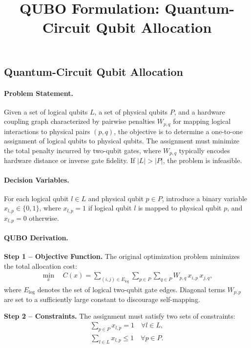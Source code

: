 \documentclass[12pt]{article}
\title{QUBO Formulation: Quantum-Circuit Qubit Allocation}
\date{}
\begin{document}
\maketitle

\subsection*{Quantum-Circuit Qubit Allocation}

\paragraph{Problem Statement.}
Given a set of logical qubits $L$, a set of physical qubits $P$, and a hardware coupling graph characterized by pairwise penalties $W_{p,q}$ for mapping logical interactions to physical pairs $(p,q)$, the objective is to determine a one-to-one assignment of logical qubits to physical qubits. The assignment must minimize the total penalty incurred by two-qubit gates, where $W_{p,q}$ typically encodes hardware distance or inverse gate fidelity. If $|L| > |P|$, the problem is infeasible.

\paragraph{Decision Variables.}
For each logical qubit $l \in L$ and physical qubit $p \in P$, introduce a binary variable $x_{l,p} \in \{0,1\}$, where $x_{l,p} = 1$ if logical qubit $l$ is mapped to physical qubit $p$, and $x_{l,p} = 0$ otherwise.

\paragraph{QUBO Derivation.}
\textbf{Step 1 -- Objective Function.} The original optimization problem minimizes the total allocation cost:
\begin{align}
\min_{x} \quad C(x) = \sum_{(i,j) \in E_{\text{log}}} \sum_{p \in P} \sum_{q \in P} W_{p,q} \, x_{i,p} \, x_{j,q},
\end{align}
where $E_{\text{log}}$ denotes the set of logical two-qubit gate edges. Diagonal terms $W_{p,p}$ are set to a sufficiently large constant to discourage self-mapping.

\textbf{Step 2 -- Constraints.} The assignment must satisfy two sets of constraints:
\begin{align}
\sum_{p \in P} x_{l,p} = 1 \quad \forall l \in L, \tag{C1}
\end{align}
\begin{align}
\sum_{l \in L} x_{l,p} \le 1 \quad \forall p \in P. \tag{C2}
\end{align}
\end{document}
